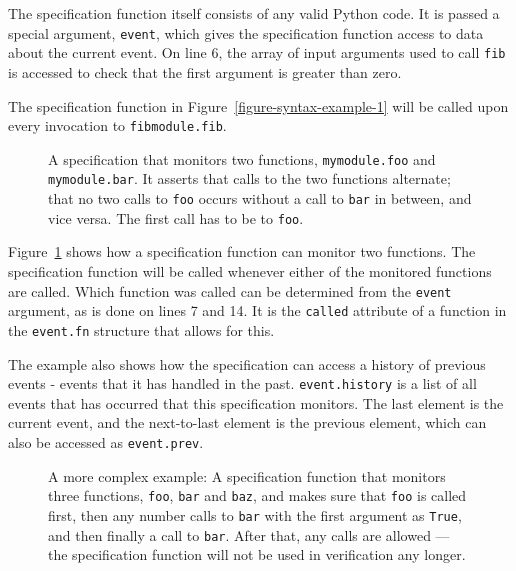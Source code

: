 \documentclass[a4paper,11pt]{kth-mag}
\theoremstyle{definition}
\begin{document}
The specification function itself consists of any valid Python code. It is
passed a special argument, \texttt{event}, which gives the specification
function access to data about the current event. On line 6, the array of input
arguments used to call \texttt{fib} is accessed to check that the first
argument is greater than zero.

The specification function in Figure~\ref{figure-syntax-example-1} will be
called upon every invocation to \texttt{fibmodule.fib}.

\begin{figure}[h!]
	\begin{center}
	\begin{minipage}{0.7\textwidth}
	
	\end{minipage}
	\end{center}

	\caption{A specification that monitors two functions, \texttt{mymodule.foo}
		and \texttt{mymodule.bar}. It asserts that calls to the two functions
		alternate; that no two calls to \texttt{foo} occurs without a call to
		\texttt{bar} in between, and vice versa. The first call has to be to
		\texttt{foo}.}
	\label{figure-syntax-example-2}
\end{figure}

Figure~\ref{figure-syntax-example-2} shows how a specification function can
monitor two functions. The specification function will be called whenever
either of the monitored functions are called. Which function was called can be
determined from the \texttt{event} argument, as is done on lines 7 and 14. It
is the \texttt{called} attribute of a function in the \texttt{event.fn}
structure that allows for this.

The example also shows how the specification can access a history of previous
events - events that it has handled in the past. \texttt{event.history} is a
list of all events that has occurred that this specification monitors. The last
element is the current event, and the next-to-last element is the previous
element, which can also be accessed as \texttt{event.prev}.

\begin{figure}[h!]
	\begin{center}
	\begin{minipage}{0.7\textwidth}
	
	\end{minipage}
	\end{center}

	\caption{A more complex example: A specification function that monitors three
		functions, \texttt{foo}, \texttt{bar} and \texttt{baz}, and makes sure that
		\texttt{foo} is called first, then any number calls to \texttt{bar} with
		the first argument as \texttt{True}, and then finally a call to
	\texttt{bar}. After that, any calls are allowed --- the specification function
will not be used in verification any longer.}
	\label{figure-syntax-example-3}
\end{figure}
\end{document}
